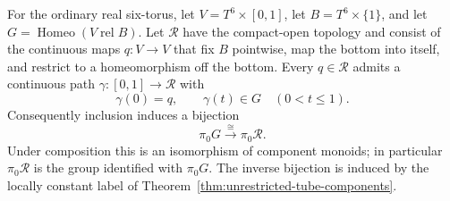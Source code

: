 \begin{theorem}
\label{thm:unrestricted-tube-component-bijection}
For the ordinary real six-torus, let
$V=T^6\times[0,1]$, let $B=T^6\times\{1\}$, and let
$G=\operatorname{Homeo}(V\;\mathrm{rel}\;B)$.
Let $\mathcal R$ have the compact-open topology and consist of the
continuous maps $q:V\to V$ that fix $B$ pointwise, map the bottom
into itself, and restrict to a homeomorphism off the bottom.
Every $q\in\mathcal R$ admits a continuous path
$\gamma:[0,1]\to\mathcal R$ with
\[
 \gamma(0)=q,\qquad \gamma(t)\in G\quad(0<t\leq1).
\]
Consequently inclusion induces a bijection
\[
 \pi_0G\xrightarrow{\ \cong\ }\pi_0\mathcal R.
\]
Under composition this is an isomorphism of component monoids;
in particular $\pi_0\mathcal R$ is the group identified with
$\pi_0G$.  The inverse bijection is induced by the locally constant
label of Theorem~\ref{thm:unrestricted-tube-components}.
\end{theorem}
